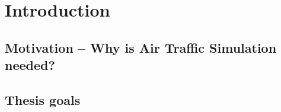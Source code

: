 \chapter{Introduction}

\section{Motivation – Why is Air Traffic Simulation needed?}
\section{Thesis goals}
